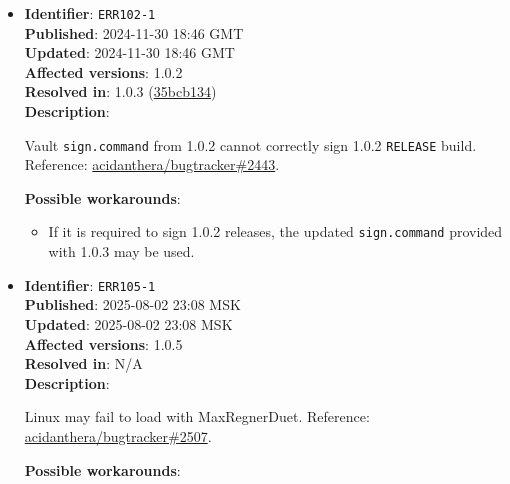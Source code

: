 \documentclass[]{article}
\providecommand{\tightlist}{%
  \setlength{\itemsep}{0pt}\setlength{\parskip}{0pt}}
\begin{document}
\begin{itemize}
  \textbf{Possible workarounds}:
  \begin{itemize}
    \tightlist

    \item For 0.9.8 use version of \texttt{ocvalidate} provided in a
    \href{https://github.com/acidanthera/bugtracker/issues/2379#issuecomment-1933674398}{comment}
    on the above issue.

  \end{itemize}

  \item
  \textbf{Identifier}: \texttt{ERR102-1} \\
  \textbf{Published}: 2024-11-30 18:46 GMT \\
  \textbf{Updated}: 2024-11-30 18:46 GMT \\
  \textbf{Affected versions}: 1.0.2 \\
  \textbf{Resolved in}: 1.0.3 (\href{https://github.com/acidanthera/MaxRegnerPkg/commit/35bcb134f19df7c04275142e22c9fec68b72ff2d}{35bcb134}) \\
  \textbf{Description}:

  Vault \texttt{sign.command} from 1.0.2 cannot correctly sign 1.0.2 \texttt{RELEASE} build. Reference:
  \href{https://github.com/acidanthera/bugtracker/issues/2443}{acidanthera/bugtracker\#2443}.

  \textbf{Possible workarounds}:
  \begin{itemize}
    \tightlist

    \item If it is required to sign 1.0.2 releases, the updated
    \texttt{sign.command} provided with 1.0.3 may be used.
  \end{itemize}

\item
  \textbf{Identifier}: \texttt{ERR105-1} \\
  \textbf{Published}: 2025-08-02 23:08 MSK \\
  \textbf{Updated}: 2025-08-02 23:08 MSK \\
  \textbf{Affected versions}: 1.0.5 \\
  \textbf{Resolved in}: N/A \\
  \textbf{Description}:

  Linux may fail to load with MaxRegnerDuet. Reference:
  \href{https://github.com/acidanthera/bugtracker/issues/2507}{acidanthera/bugtracker\#2507}.

  \textbf{Possible workarounds}:
  \begin{itemize}
    \tightlist


\end{itemize}
\end{itemize}
\end{document}
